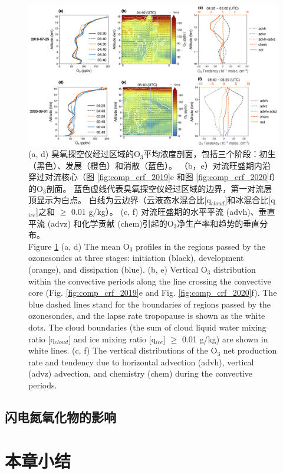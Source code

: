 \begin{figure}[htbp]
\centering
\includegraphics[width=\textwidth]{./figures/tendency_o3.png}
\caption{
(a, d) 臭氧探空仪经过区域的O$_3$平均浓度剖面，包括三个阶段：初生（黑色）、发展（橙色）和消散（蓝色）。
（b，e）对流旺盛期内沿穿过对流核心（图 \ref{fig:comp_crf_2019}e 和图 \ref{fig:comp_crf_2020}f）的O$_3$剖面。
蓝色虚线代表臭氧探空仪经过区域的边界，第一对流层顶显示为白点。
白线为云边界（云液态水混合比[q$_{cloud}$]和冰混合比[q$_{ice}$]之和 $\geq$ 0.01 g/kg）。
(c, f) 对流旺盛期的水平平流 (advh)、垂直平流 (advz) 和化学贡献 (chem)引起的O$_3$净生产率和趋势的垂直分布。
\\
Figure \ref{fig:tendency_o3} (a, d) The mean O$_3$ profiles in the regions passed by the ozonesondes
at three stages: initiation (black), development (orange), and dissipation (blue).
(b, e) Vertical O$_3$ distribution within the convective periods along the line crossing the convective core (Fig. \ref{fig:comp_crf_2019}e and Fig. \ref{fig:comp_crf_2020}f).
The blue dashed lines stand for the boundaries of regions passed by the ozonesondes, and the lapse rate tropopause is shown as the white dots.
The cloud boundaries (the sum of cloud liquid water mixing ratio [q$_{cloud}$] and ice mixing ratio [q$_{ice}$] $\geq$ 0.01 g/kg) are shown in white lines.
(c, f) The vertical distributions of the O$_3$ net production rate and tendency due to horizontal advection (advh), vertical (advz) advection, and chemistry (chem) during the convective periods.
}
\label{fig:tendency_o3}
\end{figure}




\subsection{闪电氮氧化物的影响}

\section{本章小结}
